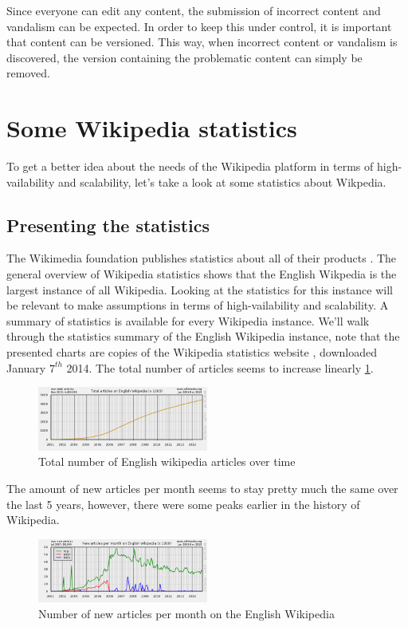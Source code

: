\documentclass[12pt]{report}
\begin{document}
Since everyone can edit any content, the submission of incorrect
content and vandalism can be expected. In
order to keep this under control, it is important that content can be
versioned.
This way, when incorrect content or vandalism is discovered, the
version containing the problematic content can simply be removed. \\

\section{Some Wikipedia statistics}
To get a better idea about the needs of the Wikipedia platform in
terms of high-vailability and scalability, let's take a look at some
statistics about Wikpedia.

\subsection{Presenting the statistics}
The Wikimedia foundation publishes statistics about all of their
products \cite{stats_wikimedia}. The general overview of Wikipedia
statistics \cite{stats_wikipedia} shows that the English Wikpedia is
the largest instance of all Wikipedia. Looking at the statistics for
this instance will be relevant to make assumptions in terms of
high-vailability and scalability.
A summary of statistics is available for every Wikipedia instance.
We'll walk through the statistics summary of the English Wikipedia
instance, note that the presented charts are copies of the Wikipedia
statistics website \cite{stats_wikipedia}, downloaded January $7^{th}$
2014.
The total number of articles seems to increase linearly \ref{wikipedia_nr_articles_over_time}.
\begin{figure}[h!]
  \caption{Total number of English wikipedia articles over time}
  \label{wikipedia_nr_articles_over_time}
  \centering
    \includegraphics[width=0.5\textwidth]{pics/wikipedia_nr_articles_over_time.png}
\end{figure}
The amount of new articles per month seems to stay pretty much the
same over the last 5 years, however, there were some peaks earlier in
the history of Wikipedia.
\begin{figure}[h!]
  \caption{Number of new articles per month on the English Wikipedia}
  \label{wikipedia_new_articles_per_month}
  \centering
    \includegraphics[width=0.5\textwidth]{pics/wikipedia_new_articles_per_month.png}
\end{figure}
\end{document}
